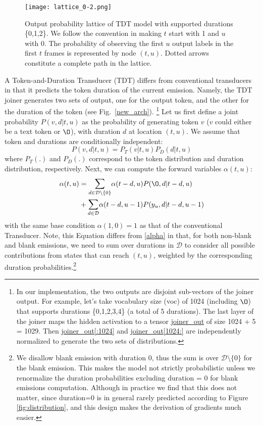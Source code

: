 \documentclass{article}
\begin{document}
\begin{figure}[t]
    \centering
    \texttt{[image: lattice\_0-2.png]}
    \caption{Output probability lattice of  TDT model with supported durations \{0,1,2\}. We follow the convention in \cite{graves2012sequence} making $t$ start with 1 and $u$ with 0. The probability of observing the first $u$ output labels  in the first $t$  frames is represented by node $(t, u)$.  Dotted arrows constitute a complete path in the lattice. }   
\label{new_lattice}
\end{figure} 
A Token-and-Duration Transducer (TDT) differs from conventional transducers in that it  predicts the token duration of the current emission. 
Namely, the TDT joiner  generates two sets of output, one for the output token, and the other for the duration of the token (see Fig.~\ref{new_arch}).
\footnote{In our implementation, the two outputs are disjoint sub-vectors of the joiner output. For example, let's take vocabulary size (voc) of 1024 (including $\O$) that supports durations \{0,1,2,3,4\} (a total of 5 durations). The last layer of the joiner maps the hidden  activation to a tensor \url{joiner_out} of size 1024 + 5 = 1029. Then \url{joiner_out[:1024]} and \url{joiner_out[1024:]} are independently normalized  to generate the two sets of distributions.}
Let us first define a joint probability $P(v, d | t, u)$ as the probability of generating token $v$ ($v$ could either be a text token or $\O$), with duration $d$ at location $(t, u)$.
We assume that token and durations are conditionally independent:  
\begin{equation}
    P(v, d | t, u) =        P_T(v | t, u) P_D(d | t, u)
\end{equation}
where $P_T(.)$ and $P_D(.)$ correspond to the token distribution and duration distribution, respectively.
Next, we can compute the forward variables $\alpha(t,u)$:
\begin{equation}
\label{eqn:alphas}
\begin{split}
    \alpha(t, u)  &=  \mathlarger{\sum}_{d\in \mathcal{D}\setminus{\{0\}}}\alpha(t - d, u) P(\O, d | t-d, u)  \\
    & +\mathlarger\sum_{d\in \mathcal{D}} \alpha(t - d, u - 1)  P(y_u, d | t-d, u-1)
\end{split}
\end{equation}
with the same base condition $\alpha(1,0) = 1$ as that of the conventional Transducer. 
Note, this Equation differs from \ref{alpha} in that, for both non-blank  and blank emissions, we need to sum over  durations in $\mathcal{D}$ to consider all possible contributions from  states that can reach $(t, u)$, weighted by the corresponding duration probabilities.\footnote{We disallow blank emission with duration 0, thus the sum is over $\mathcal{D} \setminus \{0\}$ for the blank emission. This makes the model not strictly probabilistic unless we renormalize the duration probabilities excluding duration = 0 for blank emissions computation. Although in practice we find that this does not matter, since duration=0 is in general rarely predicted according to Figure \ref{fig:distribution}, and this design makes the derivation of gradients much easier.}
\end{document}
